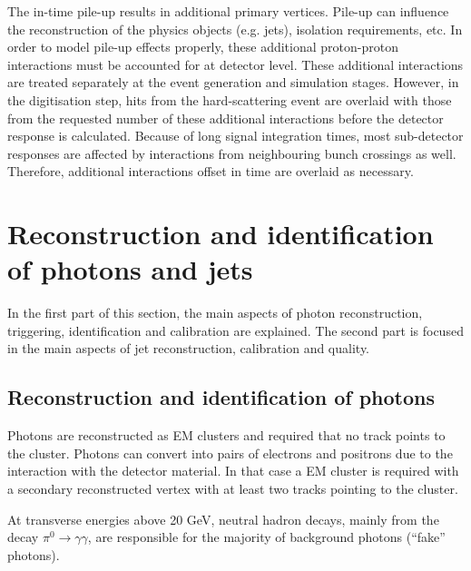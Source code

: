 \documentclass[12pt, twoside]{article}
\numberwithin{equation}{section}
\numberwithin{figure}{section}
\begin{document}
    The in-time pile-up results in additional primary vertices. Pile-up can influence the reconstruction of the physics objects (e.g. jets), isolation requirements, etc. In order to model pile-up effects properly, these additional proton-proton interactions must be accounted for at detector level. These additional interactions are treated separately at the event generation and simulation stages. However, in the digitisation step, hits from the hard-scattering event are overlaid with those from the requested number of these additional interactions before the detector response is calculated. Because of long signal integration times, most sub-detector responses are affected by interactions from neighbouring bunch crossings as well. Therefore, additional interactions offset in time are overlaid as necessary.

%
%
\newpage
\thispagestyle{empty}
\section{Reconstruction and identification of photons and jets}
\label{sec:PhotonAndJetReconstructionAndIdentification}
\vspace{1.0cm}

In the first part of this section, the main aspects of photon reconstruction, triggering, identification and calibration are explained. The second part is focused in the main aspects of jet reconstruction, calibration and quality.

\subsection{Reconstruction and identification of photons}
\label{subsec:PhotonReconstructionAndIdentification}

Photons are reconstructed as EM clusters and required that no track points to the cluster. Photons can convert into pairs of electrons and positrons due to the interaction with the detector material. In that case a EM cluster is required with a secondary reconstructed vertex with at least two tracks pointing to the cluster.

At transverse energies above 20 GeV, neutral hadron decays, mainly from the decay $\pi^{0} \rightarrow \gamma \gamma$, are responsible for the majority of background photons (``fake'' photons).
\end{document}
